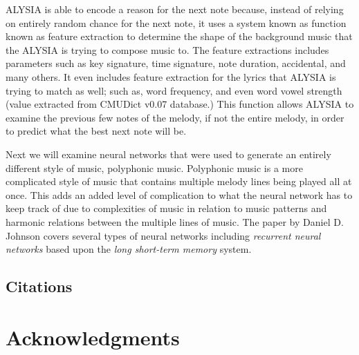 \documentclass{sig-alternate}
\begin{document}
	ALYSIA is able to encode a reason for the next note because, instead of relying on entirely random chance for the next note, it uses a system known as function known as feature extraction to determine the shape of the background music that the ALYSIA is trying to compose music to. The feature extractions includes parameters such as key signature, time signature, note duration, accidental, and many others. It even includes feature extraction for the lyrics that ALYSIA is trying to match as well; such as, word frequency, and even word vowel strength (value extracted from CMUDict v0.07 database.) This function allows ALYSIA to examine the previous few notes of the melody, if not the entire melody, in order to predict what the best next note will be.

	Next we will examine neural networks that were used to generate an entirely different style of music, polyphonic music. Polyphonic music is a more complicated style of music that contains multiple melody lines being played all at once. This adds an added level of complication to what the neural network has to keep track of due to complexities of music in relation to music patterns and harmonic relations between the multiple lines of music. The paper by Daniel D. Johnson covers several types of neural networks including \textit{recurrent neural networks} based upon the \textit{long short-term memory} system. 
	
	

\label{sec:methodsandmusic}
\subsection{Citations}
\label{sec:citations}

\subsection{}
\label{sec:theoremLikeConstructs}


\subsection*{}
\label{sec:caveatForExperts}



\section*{Acknowledgments}
\label{sec:acknowledgments}










  
\end{document}
